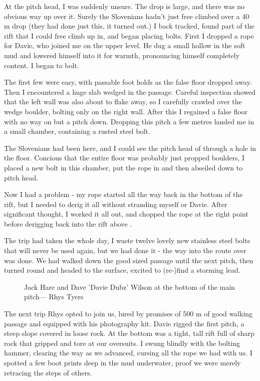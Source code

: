At the pitch head, I was suddenly unsure. The drop is large, and there was no obvious way up over it. Surely the Slovenians hadn’t just free climbed over a 40 m drop (they had done just this, it turned out.) I back tracked, found part of the rift that I could free climb up in, and began placing bolts. First I dropped a rope for Davie, who joined me on the upper level. He dug a small hollow in the soft mud and lowered himself into it for warmth, pronouncing himself completely content. I began to bolt.

The first few were easy, with passable foot holds as the false floor dropped away. Then I encountered a huge slab wedged in the passage. Careful inspection showed that the left wall was also about to flake away, so I carefully crawled over the wedge boulder, bolting only on the right wall. After this I regained a false floor with no way on but a pitch down. Dropping this pitch a few metres landed me in a small chamber, containing a rusted steel bolt.

The Slovenians had been here, and I could see the pitch head of  through a hole in the floor. Concious that the entire floor was probably just propped boulders, I placed a new bolt in this chamber, put the rope in and then abseiled down to  pitch head.

Now I had a problem - my rope started all the way back in the bottom of the rift, but I needed to derig it all without stranding myself or Davie. After significant thought, I worked it all out, and chopped the rope at the right point before derigging back into the rift above . 

The trip had taken the whole day, I waste twelve lovely new stainless steel bolts that will never be used again, but we had done it - the way into the route over  was done. We had walked down the good sized passage until the next pitch, then turned round and headed to the surface, excited to (re-)find a storming lead.

\begin{figure}[t!]
\checkoddpage \ifoddpage \forcerectofloat \else \forceversofloat \fi
\centering
{}
\caption{Jack Hare and Dave 'Davie Dubz' Wilson at the bottom of the \protect{} main pitch--- Rhys Tyers}
\label{Elec dreams main pitch}
\end{figure}

The next trip Rhys opted to join us, lured by promises of 500 m of good walking passage and equipped with his photography kit. Davie rigged the first pitch, a steep slope covered in loose rock. At the bottom was a tight, tall rift full of sharp rock that gripped and tore at our oversuits. I swung blindly with the bolting hammer, clearing the way as we advanced, cursing all the rope we had with us. I spotted a few boot prints deep in the mud underwater, proof we were merely retracing the steps of others.

